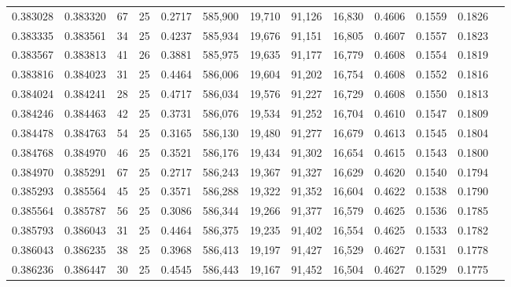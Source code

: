 \begin{tabular}{rrrrrrrrrrrrr}
0.383028 & 0.383320 &    67 &  25 &                                     0.2717 & 585,900 &  19,710 &  91,126 &  16,830 & 0.4606 & 0.1559 & 0.1826 \\
0.383335 & 0.383561 &    34 &  25 &                                     0.4237 & 585,934 &  19,676 &  91,151 &  16,805 & 0.4607 & 0.1557 & 0.1823 \\
0.383567 & 0.383813 &    41 &  26 &                                     0.3881 & 585,975 &  19,635 &  91,177 &  16,779 & 0.4608 & 0.1554 & 0.1819 \\
0.383816 & 0.384023 &    31 &  25 &                                     0.4464 & 586,006 &  19,604 &  91,202 &  16,754 & 0.4608 & 0.1552 & 0.1816 \\
0.384024 & 0.384241 &    28 &  25 &                                     0.4717 & 586,034 &  19,576 &  91,227 &  16,729 & 0.4608 & 0.1550 & 0.1813 \\
0.384246 & 0.384463 &    42 &  25 &                                     0.3731 & 586,076 &  19,534 &  91,252 &  16,704 & 0.4610 & 0.1547 & 0.1809 \\
0.384478 & 0.384763 &    54 &  25 &                                     0.3165 & 586,130 &  19,480 &  91,277 &  16,679 & 0.4613 & 0.1545 & 0.1804 \\
0.384768 & 0.384970 &    46 &  25 &                                     0.3521 & 586,176 &  19,434 &  91,302 &  16,654 & 0.4615 & 0.1543 & 0.1800 \\
0.384970 & 0.385291 &    67 &  25 &                                     0.2717 & 586,243 &  19,367 &  91,327 &  16,629 & 0.4620 & 0.1540 & 0.1794 \\
0.385293 & 0.385564 &    45 &  25 &                                     0.3571 & 586,288 &  19,322 &  91,352 &  16,604 & 0.4622 & 0.1538 & 0.1790 \\
0.385564 & 0.385787 &    56 &  25 &                                     0.3086 & 586,344 &  19,266 &  91,377 &  16,579 & 0.4625 & 0.1536 & 0.1785 \\
0.385793 & 0.386043 &    31 &  25 &                                     0.4464 & 586,375 &  19,235 &  91,402 &  16,554 & 0.4625 & 0.1533 & 0.1782 \\
0.386043 & 0.386235 &    38 &  25 &                                     0.3968 & 586,413 &  19,197 &  91,427 &  16,529 & 0.4627 & 0.1531 & 0.1778 \\
0.386236 & 0.386447 &    30 &  25 &                                     0.4545 & 586,443 &  19,167 &  91,452 &  16,504 & 0.4627 & 0.1529 & 0.1775 \\

\end{tabular}
